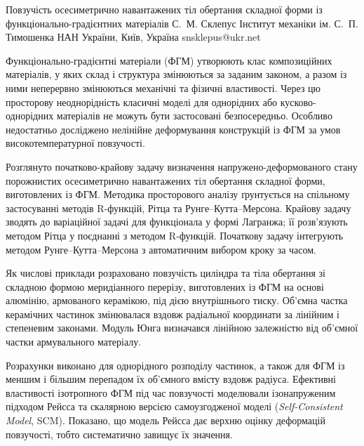 \ReportHeading
  {Повзучість осесиметрично навантажених тіл обертання складної форми із функціонально-градієнтних матеріалів}
  {С.~М. Склепус}
  {Інститут механіки ім. С.~П. Тимошенка НАН України, Київ, Україна}
  {snsklepus@ukr.net}

Функціонально-градієнтні матеріали (ФГМ) утворюють клас композиційних матеріалів, у яких склад і структура змінюються за заданим законом, а разом із ними неперервно змінюються механічні та фізичні властивості. Через цю просторову неоднорідність класичні моделі для однорідних або кусково-однорідних матеріалів не можуть бути застосовані безпосередньо. Особливо недостатньо досліджено нелінійне деформування конструкцій із ФГМ за умов високотемпературної повзучості.

Розглянуто початково-крайову задачу визначення напружено-деформованого стану порожнистих осесиметрично навантажених тіл обертання складної форми, виготовлених із ФГМ. Методика просторового аналізу ґрунтується на спільному застосуванні методів R-функцій, Рітца та Рунге--Кутта--Мерсона. Крайову задачу зводять до варіаційної задачі для функціонала у формі Лагранжа; її розв’язують методом Рітца у поєднанні з методом R-функцій. Початкову задачу інтегрують методом Рунге--Кутта--Мерсона з автоматичним вибором кроку за часом.

Як числові приклади розраховано повзучість циліндра та тіла обертання зі складною формою меридіанного перерізу, виготовлених із ФГМ на основі алюмінію, армованого керамікою, під дією внутрішнього тиску. Об’ємна частка керамічних частинок змінювалася вздовж радіальної координати за лінійним і степеневим законами. Модуль Юнга визначався лінійною залежністю від об’ємної частки армувального матеріалу.

Розрахунки виконано для однорідного розподілу частинок, а також для ФГМ із меншим і більшим перепадом їх об’ємного вмісту вздовж радіуса. Ефективні властивості ізотропного ФГМ під час повзучості моделювали ізонапруженим підходом Рейсса та скалярною версією самоузгодженої моделі (\emph{Self-Consistent Model}, SCM). Показано, що модель Рейсса дає верхню оцінку деформацій повзучості, тобто систематично завищує їх значення.
